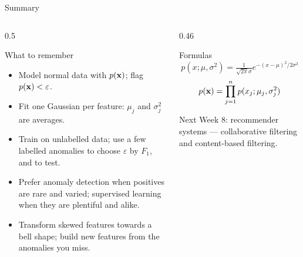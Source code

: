 \documentclass[aspectratio=169,10pt]{beamer}
\begin{document}
\begin{frame}{Summary}
  \begin{columns}[T,onlytextwidth]
    \begin{column}{0.5\textwidth}
      \begin{block}{What to remember}
        \footnotesize
        \begin{itemize}
          \item Model normal data with $p(\mathbf{x})$; flag $p(\mathbf{x})<\varepsilon$.
          \item Fit one Gaussian per feature: $\mu_j$ and $\sigma_j^2$ are averages.
          \item Train on unlabelled data; use a few labelled anomalies to choose
                $\varepsilon$ by $F_1$, and to test.
          \item Prefer anomaly detection when positives are rare and varied; supervised
                learning when they are plentiful and alike.
          \item Transform skewed features towards a bell shape; build new features from
                the anomalies you miss.
        \end{itemize}
      \end{block}
    \end{column}
    \begin{column}{0.46\textwidth}
      \begin{block}{Formulas}
        \[ p(x;\mu,\sigma^2)=\tfrac{1}{\sqrt{2\pi}\sigma}e^{-(x-\mu)^2/2\sigma^2} \]
        \[ p(\mathbf{x})=\prod_{j=1}^{n}p(x_j;\mu_j,\sigma_j^2) \]
      \end{block}
      \begin{block}{Next}
        \footnotesize Week 8: recommender systems --- collaborative filtering and
        content-based filtering.
      \end{block}
    \end{column}
  \end{columns}
\end{frame}
\end{document}
